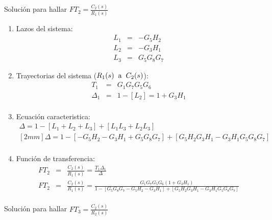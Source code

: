 \documentclass[12pt]{article}
\begin{document}
Soluci\'on para hallar \( \displaystyle FT_{2}=\frac{C_{2}(s)}{R_{1}(s)} \)

\begin{enumerate}
  \item Lazos del sistema:
    \begin{eqnarray*}
      L_{1} &=& - G_{5}H_{2} \\
      L_{2} &=& - G_{3}H_{1} \\
      L_{3} &=& G_{5}G_{8}G_{7}
    \end{eqnarray*}
  \item Trayectorias del sistema ($R_{1}(s) \hspace{2mm} \text{a} \hspace{2mm} C_{2}(s)$):
    \begin{eqnarray*}
      T_{1} &=& G_{1}G_{7}G_{5}G_{6} \\
      \Delta_{1} &=& 1-[L_{2}]=1+G_{3}H_{1} \\
    \end{eqnarray*}
  \item Ecuaci\'on caracteristica:
    \begin{eqnarray*}
      \Delta = 1-[L_{1}+L_{2}+L_{3}]+[L_{1}L_{3}+L_{2}L_{3}] \\ [2mm]
      \Delta = 1-[-G_{5}H_{2}-G_{3}H_{1}+G_{5}G_{8}G_{7}]+[G_{5}H_{2}G_{3}H_{1}-G_{3}H_{1}G_{5}G_{8}G_{7}]\\
    \end{eqnarray*}
  \item Funci\'on de transferencia:
    \begin{eqnarray*}
      FT_{2} &=& \frac{C_{2}(s)}{R_{1}(s)}=\frac{T_{1}\Delta_{1}}{\Delta} \\[5mm]
      FT_{2} &=&\frac{C_{2}(s)}{R_{1}(s)} = \frac{G_{1}G_{7}G_{5}G_{6}(1+G_{3}H_{1})}{1-[G_{5}G_{8}G_{7}-G_{5}H_{2}-G_{3}H_{1}]+[G_{5}H_{2}G_{3}H_{1}-G_{3}H_{1}G_{5}G_{8}G_{7}]} \\
    \end{eqnarray*}
\end{enumerate}

Soluci\'on para hallar \( \displaystyle FT_{3}=\frac{C_{2}(s)}{R_{2}(s)} \)
\end{document}
